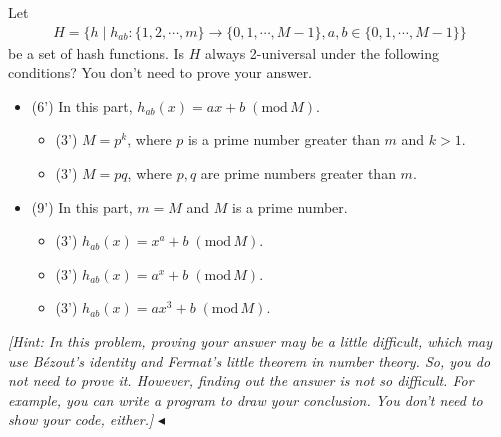 \documentclass[11pt]{article}
\newenvironment{problem}[2][Problem]{\begin{trivlist}
\item[\hskip \labelsep {\bfseries #1}\hskip \labelsep {\bfseries #2.}]}{\hfill$\blacktriangleleft$\end{trivlist}}
\begin{document}
\begin{problem}{5 (15')}
Let 
\begin{align*}
    H=\{h\mid h_{ab}:\{1,2,\cdots,m\}\rightarrow\{0,1,\cdots,M-1\}, a,b\in\{0,1,\cdots,M-1\}\}
\end{align*}
be a set of hash functions. Is $H$ always 2-universal under the following conditions? You don't need to prove your answer.
\begin{itemize}
    \item [(1)] (6') In this part, $h_{ab}(x)=ax+b\;(\mathrm{mod}\,M)$.
    \begin{itemize}
        \item [(a)] (3') $M=p^k$, where $p$ is a prime number greater than $m$ and $k>1$.
        \item [(b)] (3') $M=pq$, where $p,q$ are prime numbers greater than $m$.
    \end{itemize}
    \item [(2)] (9') In this part, $m=M$ and $M$ is a prime number.
    \begin{itemize}
        \item [(a)] (3') $h_{ab}(x)=x^a+b\;(\mathrm{mod}\,M)$.
        \item [(b)] (3') $h_{ab}(x)=a^x+b\;(\mathrm{mod}\,M)$.
        \item [(c)] (3') $h_{ab}(x)=ax^3+b\;(\mathrm{mod}\,M)$.
    \end{itemize}
\end{itemize}
\textit{[Hint: In this problem, proving your answer may be a little difficult, which may use Bézout's identity and Fermat's little theorem in number theory. So, you do not need to prove it. However, finding out the answer is not so difficult. For example, you can write a program to draw your conclusion. You don't need to show your code, either.]}
\end{problem}
\end{document}
